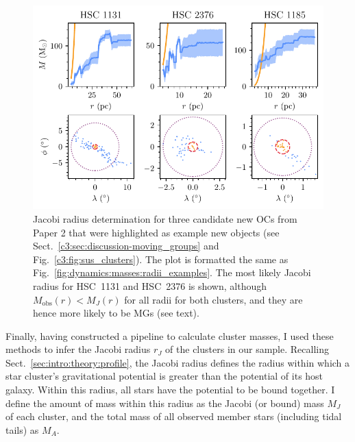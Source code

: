 \begin{figure}[t]
    \centering
    \includegraphics[width=\textwidth]{fig/c4/masses_jacobi_determination.pdf}
    \caption[Jacobi radius determination for three candidate new OCs from Paper 2 that were highlighted as example new objects]{Jacobi radius determination for three candidate new OCs from Paper 2 that were highlighted as example new objects (see Sect.~\ref{c3:sec:discussion-moving_groups} and Fig.~\ref{c3:fig:sus_clusters}). The plot is formatted the same as Fig.~\ref{fig:dynamics:masses:radii_examples}. The most likely Jacobi radius for HSC~1131 and HSC~2376 is shown, although $M_\text{obs}(r)<M_J(r)$ for all radii for both clusters, and they are hence more likely to be MGs (see text).}
    \label{fig:dynamics:masses:radii_examples_sus}
\end{figure}

Finally, having constructed a pipeline to calculate cluster masses, I used these methods to infer the Jacobi radius $r_J$ of the clusters in our sample. Recalling Sect.~\ref{sec:intro:theory:profile}, the Jacobi radius defines the radius within which a star cluster's gravitational potential is greater than the potential of its host galaxy. Within this radius, all stars have the potential to be bound together. I define the amount of mass within this radius as the Jacobi (or bound) mass $M_J$ of each cluster, and the total mass of all observed member stars (including tidal tails) as $M_A$.

